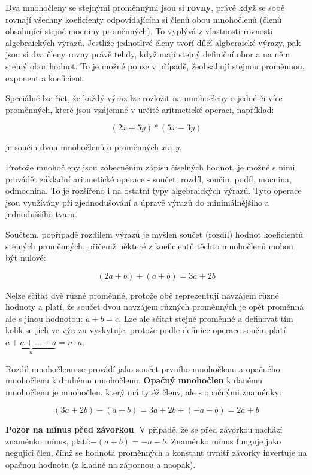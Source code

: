 Dva mnohočleny se stejnými proměnnými jsou si {\bf rovny}, právě když se sobě rovnají všechny koeficienty odpovídajících si členů obou mnohočlenů (členů obsahující stejné mocniny proměnných). To vyplývá z vlastnosti rovnosti algebraických výrazů. Jestliže jednotlivé členy tvoří dílčí algberaické výrazy, pak jsou si dva členy rovny právě tehdy, když mají stejný definiční obor a na něm stejný obor hodnot. To je možné pouze v případě, žeobsahují stejnou proměnnou, exponent a koeficient. 

Speciálně lze říct, že každý výraz lze rozložit na mnohočleny o jedné či více proměnných, které jsou vzájemně v určité aritmetické operaci, například:

$$ (2x+5y) * (5x-3y) $$

je součin dvou mnohočlenů o proměnných {\it x} a {\it y}.



Protože mnohočleny jsou zobecněním zápisu číselných hodnot, je možné s nimi provádět základní aritmetické operace - součet, rozdíl, součin, podíl, mocnina, odmocnina. To je rozšířeno i na ostatní typy algebraických výrazů. Tyto operace jsou využívány při zjednodušování a úpravě výrazů do minimálnějšího a jednoduššího tvaru.


Součtem, popřípadě rozdílem výrazů je myšlen součet (rozdíl) hodnot koeficientů stejných proměnných, přičemž některé z koeficientů těchto mnohočlenů mohou být nulové:

$$ (2a+b) + (a+b) = 3a + 2b $$

Nelze sčítat dvě různé proměnné, protože obě reprezentují navzájem různé hodnoty a platí, že součet dvou navzájem různých proměnných je opět proměnná ale s jinou hodnotou: $a+b=c$. Lze ale sčítat stejné proměnné a definovat tím kolik se jich ve výrazu vyskytuje, protože podle definice operace součin platí: $\underbrace{a+a+...+a}_n=n\cdot a$.

Rozdíl mnohočlenu se provádí jako součet prvního mnohočlenu a opačného mnohočlenu k druhému mnohočlenu. {\bf Opačný mnohočlen} k danému mnohočlenu je mnohočlen, který má tytéž členy, ale s opačnými znaménky:

$$ (3a+2b) - (a+b) = 3a + 2b + (-a -b) =  2a + b $$

{\bf Pozor na mínus před závorkou}. V případě, že se před závorkou nachází znaménko mínus, platí:$-(a+b)=-a-b$. Znaménko mínus funguje jako negující člen, čímž se hodnota proměnných a konstant uvnitř závorky invertuje na opačnou hodnotu (z kladné na zápornou a naopak).

